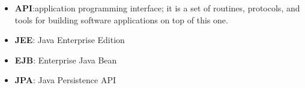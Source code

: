 \begin{itemize}
	\item \textbf{API}:\@ application programming interface; it is a set of routines, protocols, and tools for building software applications on top of this one.
	
\item \textbf{JEE}: Java Enterprise Edition

\item \textbf{EJB}: Enterprise Java Bean

\item \textbf{JPA}: Java Persistence API

\end{itemize}
